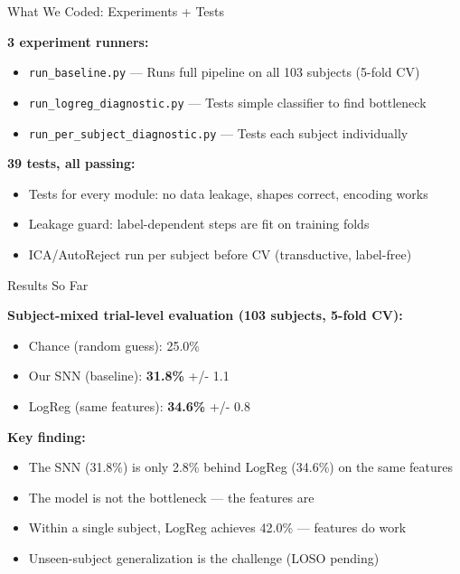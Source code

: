 \documentclass[10pt]{beamer}
\begin{document}
\begin{frame}{What We Coded: Experiments + Tests}

\small
\textbf{3 experiment runners:}

\vspace{4pt}
\begin{itemize}
  \item \texttt{run\_baseline.py} --- Runs full pipeline on all 103 subjects (5-fold CV)
  \item \texttt{run\_logreg\_diagnostic.py} --- Tests simple classifier to find bottleneck
  \item \texttt{run\_per\_subject\_diagnostic.py} --- Tests each subject individually
\end{itemize}

\vspace{6pt}
\textbf{39 tests, all passing:}

\vspace{4pt}
\begin{itemize}
  \item Tests for every module: no data leakage, shapes correct, encoding works
  \item Leakage guard: label-dependent steps are fit on training folds
  \item ICA/AutoReject run per subject before CV (transductive, label-free)
\end{itemize}

\end{frame}

\begin{frame}{Results So Far}

\small
\textbf{Subject-mixed trial-level evaluation (103 subjects, 5-fold CV):}

\vspace{6pt}
\begin{itemize}
  \item Chance (random guess): 25.0\%
  \item Our SNN (baseline): \textbf{31.8\%} +/- 1.1
  \item LogReg (same features): \textbf{34.6\%} +/- 0.8
\end{itemize}

\vspace{6pt}
\textbf{Key finding:}

\vspace{4pt}
\begin{itemize}
  \item The SNN (31.8\%) is only 2.8\% behind LogReg (34.6\%) on the same features
  \item The model is not the bottleneck --- the features are
  \item Within a single subject, LogReg achieves 42.0\% --- features do work
  \item Unseen-subject generalization is the challenge (LOSO pending)
\end{itemize}

\end{frame}
\end{document}
